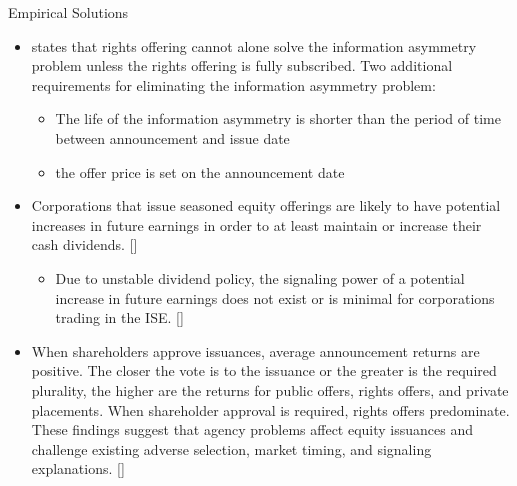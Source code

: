 \documentclass{beamer}
\begin{document}
\begin{frame}{Empirical Solutions}
	\begin{itemize}
		\tiny
		 \item \cite{loderer1988stock} states that rights offering cannot alone solve the  information asymmetry problem unless the rights offering is fully subscribed. Two additional requirements for eliminating the information asymmetry problem:
		 \begin{itemize}\tiny
		 	\item The life of the information asymmetry is shorter than the period of time
		 	between announcement and issue date
		 	\item  the offer price is set on the announcement date
		 \end{itemize}
	 \item Corporations that  issue seasoned equity offerings are likely to have potential increases in future earnings in order to at least maintain or increase their cash dividends. [\cite{lasfer1997motivation}]
	 \begin{itemize}\tiny
	 	\item Due to unstable dividend policy, the signaling power of a potential increase in future earnings does not exist or is minimal
	 	for corporations trading in the ISE. [\cite{adaoglu2006market}]
	 \end{itemize}
		 \item 
		 When shareholders approve issuances, average announcement returns are positive. The closer the vote is to the issuance or the greater is the required plurality, the higher
		 are the returns for public offers, rights offers, and private placements. When shareholder
		 approval is required, rights offers predominate. These findings suggest that agency problems affect equity issuances and challenge existing adverse selection, market timing, and signaling explanations. [\cite{holderness2018equity}]
	\end{itemize}
\end{frame}
\end{document}
